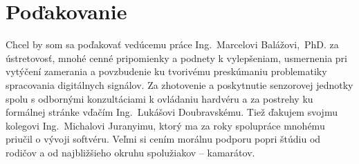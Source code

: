 \thispagestyle{empty}
\vspace*{\fill}
\section*{Poďakovanie}
Chcel by som sa poďakovať vedúcemu práce Ing.~Marcelovi Balážovi,~PhD. za ústretovosť, mnohé cenné pripomienky a podnety k vylepšeniam, usmernenia pri vytýčení 
zamerania a povzbudenie ku tvorivému preskúmaniu problematiky spracovania digitálnych signálov. Za zhotovenie a poskytnutie 
senzorovej jednotky spolu s odbornými konzultáciami k ovládaniu hardvéru a za postrehy ku formálnej stránke vďačím Ing.~Lukášovi Doubravskému. Tiež ďakujem svojmu kolegovi Ing.~Michalovi Juranyimu, ktorý ma za roky spolupráce mnohému priučil o vývoji softvéru.
Veľmi si cením morálnu podporu popri štúdiu od rodičov a od najbližšieho okruhu spolužiakov -- kamarátov.
\vspace{3cm}